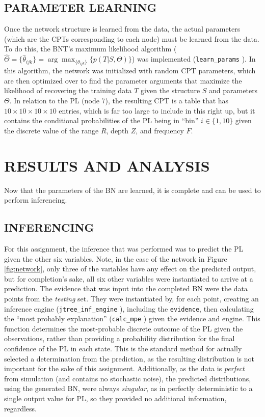\documentclass[12pt]{article}
\begin{document}
\subsection{PARAMETER LEARNING}
Once the network structure is learned from the data, the actual parameters (which are the CPTs corresponding to each node) must be learned from the data. To do this, the BNT's maximum likelihood algorithm ($\hat\Theta=\{\hat\theta_{ijk}\}=\arg\max_{\{\theta_{ijk}\}}\{p(T|S,\Theta)\}$) was implemented (\texttt{learn\_params} \cite{BNT}). In this algorithm, the network was initialized with random CPT parameters, which are then optimized over to find the parameter arguments that maximize the likelihood of recovering the training data $T$ given the structure $S$ and parameters $\Theta$. In relation to the PL (node 7), the resulting CPT is a table that has $10\times10\times10\times10$ entries, which is far too large to include in this right up, but it contains the conditional probabilities of the PL being in ``bin'' $i\in\{1,10\}$ given the discrete value of the range $R$, depth $Z$, and frequency $F$.

\section{RESULTS AND ANALYSIS}\label{sec:results}
Now that the parameters of the BN are learned, it is complete and can be used to perform inferencing.

\subsection{INFERENCING}
For this assignment, the inference that was performed was to predict the PL given the other six variables. Note, in the case of the network in Figure \ref{fig:network}, only three of the variables have any effect on the predicted output, but for completion's sake, all six other variables were instantiated to arrive at a prediction. The evidence that was input into the completed BN were the data points from the \textit{testing} set. They were instantiated by, for each point, creating an inference engine (\texttt{jtree\_inf\_engine} \cite{BNT}), including the \texttt{evidence}, then calculating the ``most probably explanation'' (\texttt{calc\_mpe} \cite{BNT}) given the evidence and engine. This function determines the most-probable discrete outcome of the PL given the observations, rather than providing a probability distribution for the final confidence of the PL in each state. This is the standard method for actually selected a determination from the prediction, as the resulting distribution is not important for the sake of this assignment. Additionally, as the data is \textit{perfect} from simulation (and contains no stochastic noise), the predicted distributions, using the generated BN, were always \textit{singular}, as in perfectly deterministic to a single output value for PL, so they provided no additional information, regardless.
\end{document}

